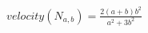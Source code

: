 \documentclass[preview]{standalone}
\begin{document}
\begin{align*}
velocity(N_{a,b})=\frac{2(a+b)b^2}{a^2+3b^2}
\end{align*}
\end{document}
